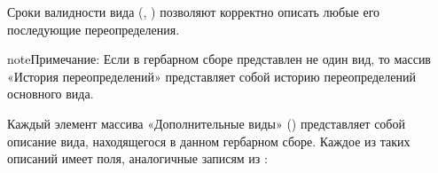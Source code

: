 \documentclass[letterpaper,10pt,russian]{sphinxmanual}
\begin{document}
Сроки валидности вида (, ) позволяют корректно описать любые его последующие переопределения.

\begin{sphinxadmonition}{note}{Примечание:}
Если в гербарном сборе представлен не один вид,
то массив «История переопределений» представляет собой историю переопределений основного вида.
\end{sphinxadmonition}

\ignorespaces 
{}

Каждый элемент массива «Дополнительные виды» () представляет собой
описание вида, находящегося в данном гербарном сборе. Каждое из таких описаний имеет
поля, аналогичные записям из :
\end{document}
